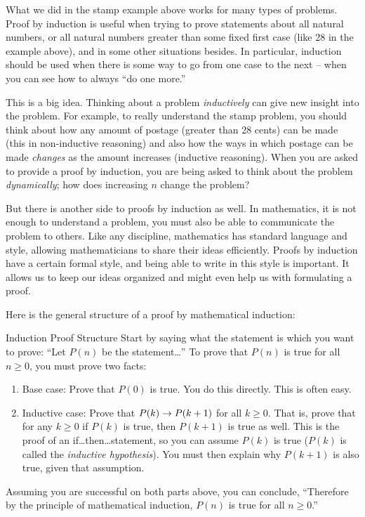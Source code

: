 \documentclass[12pt]{article}
\begin{document}
What we did in the stamp example above works for many types of problems.  Proof by induction is useful when trying to prove statements about all natural numbers, or all natural numbers greater than some fixed first case (like 28 in the example above), and in some other situations besides.  In particular, induction should be used when there is some way to go from one case to the next -- when you can see how to always ``do one more.''

This is a big idea.  Thinking about a problem {\em inductively} can give new insight into the problem.  For example, to really understand the stamp problem, you should think about how any amount of postage (greater than 28 cents) can be made (this in non-inductive reasoning) and also how the ways in which postage can be made {\em changes} as the amount increases (inductive reasoning).  When you are asked to provide a proof by induction, you are being asked to think about the problem {\em dynamically}; how does increasing $n$ change the problem?  

But there is another side to proofs by induction as well.  In mathematics, it is not enough to understand a problem, you must also be able to communicate the problem to others.  Like any discipline, mathematics has standard language and style, allowing mathematicians to share their ideas efficiently.  Proofs by induction have a certain formal style, and being able to write in this style is important.  It allows us to keep our ideas organized and might even help us with formulating a proof.

Here is the general structure of a proof by mathematical induction:

\begin{defbox}{Induction Proof Structure}
Start by saying what the statement is which you want to prove: ``Let $P(n)$ be the statement\ldots''
To prove that $P(n)$ is true for all $n \ge 0$, you must prove two facts:

\begin{enumerate}
  \item Base case: Prove that $P(0)$ is true.  You do this directly.  This is often easy.
  \item Inductive case: Prove that $P(k) \rightarrow P(k+1)$ for all $k \ge 0$.  That is, prove that for any $k \ge 0$ if $P(k)$ is true, then $P(k+1)$ is true as well.  This is the proof of an if\ldots then\ldots statement, so you can assume $P(k)$ is true ($P(k)$ is called the {\em inductive hypothesis}).  You must then explain why $P(k+1)$ is also true, given that assumption.  
\end{enumerate}

Assuming you are successful on both parts above, you can conclude, ``Therefore by the principle of mathematical induction, $P(n)$ is true for all $n \ge 0$.''
\end{defbox}
\end{document}
